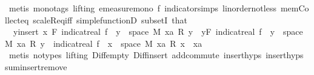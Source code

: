 \begin{isabellebody}
\ {\isacharparenleft}{\kern0pt}metis\ {\isacharparenleft}{\kern0pt}mono{\isacharunderscore}{\kern0pt}tags{\isacharcomma}{\kern0pt}\ lifting{\isacharparenright}{\kern0pt}\ emeasure{\isacharunderscore}{\kern0pt}mono\ f{\isacharparenleft}{\kern0pt}{}{\isacharparenright}{\kern0pt}\ indicator{\isacharunderscore}{\kern0pt}simps{\isacharparenleft}{\kern0pt}{}{\isacharparenright}{\kern0pt}\ linorder{\isacharunderscore}{\kern0pt}not{\isacharunderscore}{\kern0pt}less\ mem{\isacharunderscore}{\kern0pt}Collect{\isacharunderscore}{\kern0pt}eq\ scaleR{\isacharunderscore}{\kern0pt}eq{\isacharunderscore}{\kern0pt}{}{\isacharunderscore}{\kern0pt}iff\ simple{\isacharunderscore}{\kern0pt}functionD{\isacharparenleft}{\kern0pt}{}{\isacharparenright}{\kern0pt}\ subsetI\ that{\isacharparenright}{\kern0pt}\isanewline
\isanewline
\ \ \ \ \isamarkupfalse%
\ {\isacharasterisk}{\kern0pt}{\isacharcolon}{\kern0pt}\ {\isachardoublequoteopen}{\isacharparenleft}{\kern0pt}{\isasymSum}y{\isasymin}insert\ x\ F{\isachardot}{\kern0pt}\ indicat{\isacharunderscore}{\kern0pt}real\ {\isacharparenleft}{\kern0pt}f\ {\isacharminus}{\kern0pt}{\isacharbackquote}{\kern0pt}\ {\isacharbraceleft}{\kern0pt}y{\isacharbraceright}{\kern0pt}\ {\isasyminter}\ space\ M{\isacharparenright}{\kern0pt}\ xa\ {\isacharasterisk}{\kern0pt}\isactrlsub R\ y{\isacharparenright}{\kern0pt}\ {\isacharequal}{\kern0pt}\ {\isacharparenleft}{\kern0pt}{\isasymSum}y{\isasymin}F{\isachardot}{\kern0pt}\ indicat{\isacharunderscore}{\kern0pt}real\ {\isacharparenleft}{\kern0pt}f\ {\isacharminus}{\kern0pt}{\isacharbackquote}{\kern0pt}\ {\isacharbraceleft}{\kern0pt}y{\isacharbraceright}{\kern0pt}\ {\isasyminter}\ space\ M{\isacharparenright}{\kern0pt}\ xa\ {\isacharasterisk}{\kern0pt}\isactrlsub R\ y{\isacharparenright}{\kern0pt}\ {\isacharplus}{\kern0pt}\ indicat{\isacharunderscore}{\kern0pt}real\ {\isacharparenleft}{\kern0pt}f\ {\isacharminus}{\kern0pt}{\isacharbackquote}{\kern0pt}\ {\isacharbraceleft}{\kern0pt}x{\isacharbraceright}{\kern0pt}\ {\isasyminter}\ space\ M{\isacharparenright}{\kern0pt}\ xa\ {\isacharasterisk}{\kern0pt}\isactrlsub R\ x{\isachardoublequoteclose}\ \ xa\ \isamarkupfalse%
\ {\isacharparenleft}{\kern0pt}metis\ {\isacharparenleft}{\kern0pt}no{\isacharunderscore}{\kern0pt}types{\isacharcomma}{\kern0pt}\ lifting{\isacharparenright}{\kern0pt}\ Diff{\isacharunderscore}{\kern0pt}empty\ Diff{\isacharunderscore}{\kern0pt}insert{}\ add{\isachardot}{\kern0pt}commute\ insert{\isachardot}{\kern0pt}hyps{\isacharparenleft}{\kern0pt}{}{\isacharparenright}{\kern0pt}\ insert{\isachardot}{\kern0pt}hyps{\isacharparenleft}{\kern0pt}{}{\isacharparenright}{\kern0pt}\ sum{\isachardot}{\kern0pt}insert{\isacharunderscore}{\kern0pt}remove{\isacharparenright}{\kern0pt}\isanewline

\end{isabellebody}
